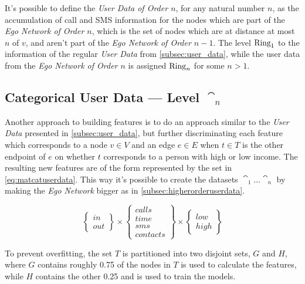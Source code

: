 It's possible to define the \emph{User Data of Order $n$}, for any natural number $n$, as the accumulation of call and SMS information for the nodes which are part of the \emph{Ego Network of Order $n$}, which is the set of nodes which are at distance at most $n$ of $v$, and aren't part of the \emph{Ego Network of Order $n - 1$}. The level $\operatorname{Ring}_1$ to the information of the regular \emph{User Data} from \cref{subsec:user_data}, while the user data from the \emph{Ego Network of Order $n$} is assigned $\operatorname{Ring}_n$ for some $n > 1$.

\subsection{Categorical User Data --- Level $\cat_n$}
\label{subsec:categoricaluserdata}

Another approach to building features is to do an approach similar to the \emph{User Data} presented in \cref{subsec:user_data}, but further discriminating each feature which corresponds to a node $v \in V$ and an edge $e \in E$ when $t \in T$ is the other endpoint of $e$ on whether $t$ corresponds to a person with high or low income. The resulting new features are of the form represented by the set in \cref{eq:matcatuserdata}. This way it's possible to create the datasets $\cat_1 \dots \cat_n$ by making the \emph{Ego Network} bigger as in \cref{subsec:higherorderuserdata}.

\begin{equation}
\begin{Bmatrix} in \\ out \end{Bmatrix}
\times
\begin{Bmatrix} calls \\ time \\ sms \\ contacts \end{Bmatrix}
\times
\begin{Bmatrix} low \\ high \end{Bmatrix}
\label{eq:matcatuserdata}
\end{equation}

To prevent overfitting, the set $T$ is partitioned into two disjoint sets, $G$ and $H$, where $G$ contains roughly 0.75 of the nodes in $T$ is used to calculate the features, while $H$ contains the other 0.25 and is used to train the models.
